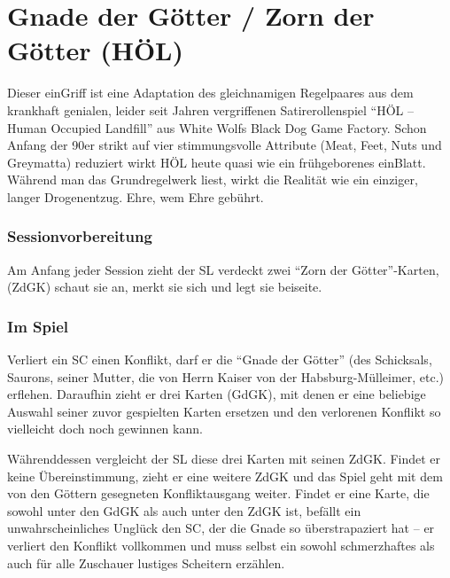 \section{Gnade der Götter / Zorn der Götter (HÖL)}

Dieser einGriff ist eine Adaptation des gleichnamigen Regelpaares aus dem krankhaft genialen, leider seit Jahren vergriffenen Satirerollenspiel "`HÖL – Human Occupied Landfill"' aus White Wolfs Black Dog Game Factory. Schon Anfang der 90er strikt auf vier stimmungsvolle Attribute (Meat, Feet, Nuts und Greymatta) reduziert wirkt HÖL heute quasi wie ein frühgeborenes einBlatt. Während man das Grundregelwerk liest, wirkt die Realität wie ein einziger, langer Drogenentzug. Ehre, wem Ehre gebührt.

\subsubsection{Sessionvorbereitung}
Am Anfang jeder Session zieht der SL verdeckt zwei "`Zorn der Götter"'-Karten, (ZdGK) schaut sie an, merkt sie sich und legt sie beiseite.

\subsubsection{Im Spiel}

Verliert ein SC einen Konflikt, darf er die "`Gnade der Götter"' (des Schicksals, Saurons, seiner Mutter, die von Herrn Kaiser von der Habsburg-Mülleimer, etc.) erflehen. Daraufhin zieht er drei Karten (GdGK), mit denen er eine beliebige Auswahl seiner zuvor gespielten Karten ersetzen und den verlorenen Konflikt so vielleicht doch noch gewinnen kann.

Währenddessen vergleicht der SL diese drei Karten mit seinen ZdGK. Findet er keine Übereinstimmung, zieht er eine weitere ZdGK und das Spiel geht mit dem von den Göttern gesegneten Konfliktausgang weiter. Findet er eine Karte, die sowohl unter den GdGK als auch unter den ZdGK ist, befällt ein unwahrscheinliches Unglück den SC, der die Gnade so überstrapaziert hat -- er verliert den Konflikt vollkommen und muss selbst ein sowohl schmerzhaftes als auch für alle Zuschauer lustiges Scheitern erzählen.

